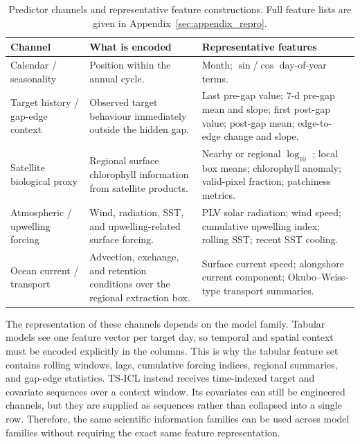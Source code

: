 \begin{table}[htbp]
\centering
\caption{Predictor channels and representative feature constructions. Full feature lists are
given in Appendix~\ref{sec:appendix_repro}.}
\label{tab:predictor_families}
\small
\renewcommand{\arraystretch}{1.15}
\begin{tabularx}{\textwidth}{P{3.0cm}Y Y}
\toprule
Channel & What is encoded & Representative features \\
\midrule
Calendar / seasonality
& Position within the annual cycle.
& Month; $\sin$/$\cos$ day-of-year terms. \\

Target history / gap-edge context
& Observed target behaviour immediately outside the hidden gap.
& Last pre-gap value; 7-d pre-gap mean and slope; first post-gap value; post-gap mean;
edge-to-edge change and slope. \\

Satellite biological proxy
& Regional surface chlorophyll information from satellite products.
& Nearby or regional $\log_{10}$ \chl{}; local box means; chlorophyll anomaly; valid-pixel
fraction; patchiness metrics. \\

Atmospheric / upwelling forcing
& Wind, radiation, SST, and upwelling-related surface forcing.
& PLV solar radiation; wind speed; cumulative upwelling index; rolling SST; recent SST
cooling. \\

Ocean current / transport
& Advection, exchange, and retention conditions over the regional extraction box.
& Surface current speed; alongshore current component;
Okubo--Weiss-type transport summaries. \\
\bottomrule
\end{tabularx}
\end{table}

The representation of these channels depends on the model family. Tabular models see one
feature vector per target day, so temporal and spatial context must be encoded explicitly in
the columns. This is why the tabular feature set contains rolling windows, lags, cumulative
forcing indices, regional summaries, and gap-edge statistics. TS-ICL instead receives
time-indexed target and covariate sequences over a context window. Its covariates can still be
engineered channels, but they are supplied as sequences rather than collapsed into a single
row. Therefore, the same scientific information families can be used across model families
without requiring the exact same feature representation.
